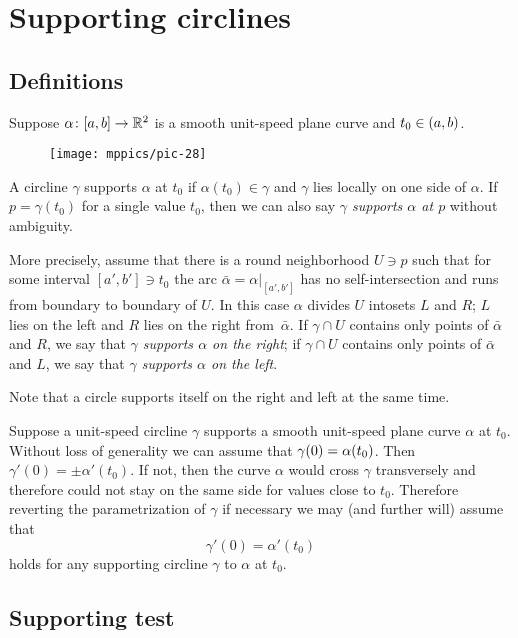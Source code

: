 \chapter{Supporting circlines}

\section{Definitions}

Suppose $\alpha\colon[a,b]\to\mathbb{R}^2$ is a smooth unit-speed plane curve and $t_0\z\in(a,b)$.

\begin{wrapfigure}{r}{43 mm}
\vskip-4mm
\centering
\texttt{[image: mppics/pic-28]}
\vskip0mm
\end{wrapfigure}

A circline $\gamma$ supports $\alpha$ at $t_0$ if $\alpha(t_0)\in\gamma$
and $\gamma$ lies locally on one side of $\alpha$.
If $p=\gamma(t_0)$ for a single value $t_0$,
then we can also say \emph{$\gamma$ supports $\alpha$ at $p$} without ambiguity.

More precisely, assume that there is a round neighborhood $U\ni p$ such that for some interval $[a',b']\ni t_0$
the arc $\bar\alpha=\alpha|_{[a',b']}$ has no self-intersection and runs from boundary to boundary of $U$.
In this case $\alpha$ divides $U$ intosets  $L$ and $R$;
$L$ lies on the left and $R$ lies on the right from~$\bar\alpha$.
If $\gamma\cap U$ contains only points of $\bar\alpha$ and $R$, we say that \emph{$\gamma$ supports $\alpha$ on the right};
if $\gamma\cap U$ contains only points of $\bar\alpha$ and $L$, we say that \emph{$\gamma$ supports $\alpha$ on the left}.



Note that a circle supports itself on the right and left at the same time.

Suppose a unit-speed circline $\gamma$ supports a smooth unit-speed plane curve $\alpha$ at $t_0$.
Without loss of generality we can assume that $\gamma(0)\z=\alpha(t_0)$. 
Then $\gamma'(0)=\pm\alpha'(t_0)$.
If not, then the curve $\alpha$ would cross $\gamma$ transversely and therefore could not stay on the same side for values close to $t_0$.
Therefore reverting the parametrization of $\gamma$ if necessary we may (and further will) assume that 
\[\gamma'(0)=\alpha'(t_0)\]
holds for any supporting circline $\gamma$ to $\alpha$ at $t_0$.

\section{Supporting test}

